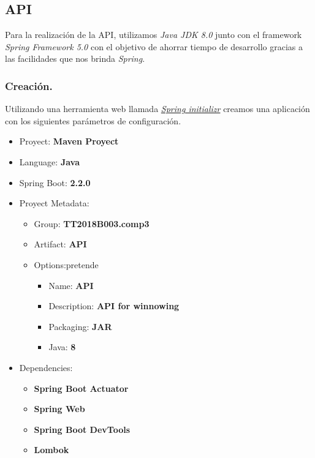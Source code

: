 \documentclass[12pt, a4paper, titlepage]{report}
\begin{document}
	        \subsection{API}
	            Para la realización de la API, utilizamos \textit{Java JDK 8.0} junto con el framework \textit{Spring Framework 5.0} con el objetivo de ahorrar tiempo de desarrollo gracias a las facilidades que nos brinda \textit{Spring}.
	            
	            \subsubsection{Creación.}
	                Utilizando una herramienta web llamada \textit{\href{https://start.spring.io/}{Spring initializr}} creamos una aplicación con los siguientes parámetros de configuración.
	                \begin{itemize}
	                    \item Proyect: \textbf{Maven Proyect}
	                    \item Language: \textbf{Java}
	                    \item Spring Boot: \textbf{2.2.0}
	                    \item Proyect Metadata:
	                    \begin{itemize}
	                        \item Group: \textbf{TT2018B003.comp3}
	                        \item Artifact: \textbf{API}
	                        \item Options:pretende
	                        \begin{itemize}
	                            \item Name: \textbf{API}
	                            \item Description: \textbf{API for winnowing}
	                            \item Packaging: \textbf{JAR}
	                            \item Java: \textbf{8} 
	                        \end{itemize}
	                    \end{itemize}
	                    \item Dependencies:
	                    \begin{itemize}
	                        \item \textbf{Spring Boot Actuator}
	                        \item \textbf{Spring Web}
	                        \item \textbf{Spring Boot DevTools}
	                        \item \textbf{Lombok}
	                    \end{itemize}
	                \end{itemize}
	        
\end{document}
